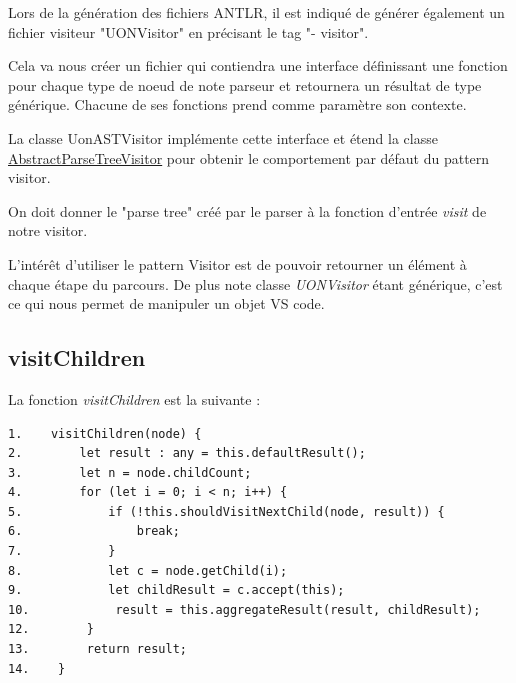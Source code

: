 \documentclass[
    iict, %
    il, %
]{heig-tb}
\begin{document}
Lors de la génération des fichiers ANTLR, il est indiqué de générer également un fichier visiteur "UONVisitor" en précisant le tag "- visitor".

Cela va nous créer un fichier qui contiendra une interface définissant une fonction pour chaque type de noeud de note parseur et retournera un résultat de type générique.
Chacune de ses fonctions prend comme paramètre son contexte.


La classe UonASTVisitor implémente cette interface et étend la classe \href{https://www.antlr.org/api/Java/org/antlr/v4/runtime/tree/AbstractParseTreeVisitor.html}{AbstractParseTreeVisitor}
pour obtenir le comportement par défaut du pattern visitor.

On doit donner le "parse tree" créé par le parser à la fonction d'entrée \emph{visit} de notre visitor. %

L'intérêt d'utiliser le pattern Visitor est de pouvoir retourner un élément à chaque étape du parcours.
De plus note classe \emph{UONVisitor} étant générique, c'est ce qui nous permet de manipuler un objet VS code.



\subsection{visitChildren}

La fonction \emph{visitChildren} est la suivante :

\begin{lstlisting}
1.    visitChildren(node) {
2.        let result : any = this.defaultResult();
3.        let n = node.childCount;
4.        for (let i = 0; i < n; i++) {
5.            if (!this.shouldVisitNextChild(node, result)) {
6.                break;
7.            }
8.            let c = node.getChild(i);
9.            let childResult = c.accept(this);
10.            result = this.aggregateResult(result, childResult);
12.        }
13.        return result;
14.    }
\end{lstlisting}
\end{document}
